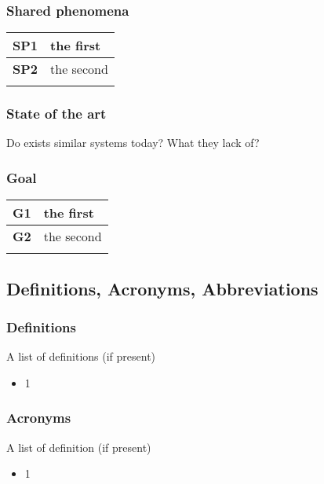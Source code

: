 \subsubsection*{Shared phenomena}
\begin{table}[h]
    \begin{tabular}{|l|l|}
        \toprule
        \textbf{SP1} & the first  \\ \midrule
        \textbf{SP2} & the second \\ \midrule
                     &            \\ \bottomrule
    \end{tabular}
\end{table}
\subsubsection*{State of the art}
Do exists similar systems today? What they lack of?
\subsubsection*{Goal}
\begin{table}[h]
    \begin{tabular}{|l|l|}
        \toprule
        \textbf{G1} & the first  \\ \midrule
        \textbf{G2} & the second \\ \midrule
                    &            \\ \bottomrule
    \end{tabular}
\end{table}


\subsection{Definitions, Acronyms, Abbreviations}
\subsubsection*{Definitions}
A list of definitions (if present)
\begin{itemize}
    \item 1
\end{itemize}
\subsubsection*{Acronyms}
A list of definition (if present)
\begin{itemize}
    \item 1
\end{itemize}
